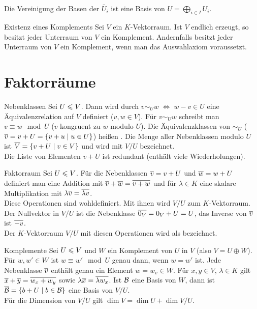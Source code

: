 \begin{Kor}
    Die Vereinigung der Basen der $\widetilde{U_i}$ ist eine Basis
    von $U = \bigoplus_{i \in I} U_i$.
\end{Kor}

\begin{Satz}{Existenz eines Komplements}
    Sei $V$ ein $K$-Vektorraum.
    Ist $V$ endlich erzeugt, so besitzt jeder Unterraum von $V$ ein Komplement.
    Andernfalls besitzt jeder Unterraum von $V$ ein Komplement, wenn man
    das Auswahlaxiom voraussetzt.
\end{Satz}

\section{%
    Faktorräume%
}

\begin{Def}{Nebenklassen}
    Sei $U \leqslant V$.
    Dann wird durch $v \sim_U w \;\Leftrightarrow\; w - v \in U$ eine
    Äquivalenzrelation auf $V$ definiert ($v, w \in V$).
    Für $v \sim_U w$ schreibt man $v \equiv w \mod U$
    ($v$ kongruent zu $w$ modulo $U$).
    Die Äquivalenzklassen von $\sim_U$
    ($\overline{v} = v + U = \{v + u \;|\; u \in U\}$) heißen
    .
    Die Menge aller Nebenklassen modulo $U$ ist
    $\overline{V} = \{v + U \;|\; v \in V\}$ und wird mit $V/U$ bezeichnet. \\
    Die Liste von Elementen $v + U$ ist redundant (enthält viele
    Wiederholungen).
\end{Def}

\begin{Def}{Faktorraum}
    Sei $U \leqslant V$.
    Für die Nebenklassen $\overline{v} = v + U$ und $\overline{w} = w + U$
    definiert man eine Addition mit
    $\overline{v} + \overline{w} = \overline{v + w}$ und für $\lambda \in K$
    eine skalare Multiplikation mit
    $\lambda \overline{v} = \overline{\lambda v}$. \\
    Diese Operationen sind wohldefiniert.
    Mit ihnen wird $V/U$ zum $K$-Vektorraum. \\
    Der Nullvektor in $V/U$ ist die Nebenklasse
    $\overline{0_V} = 0_V + U = U$, das Inverse von $\overline{v}$ ist $\overline{-v}$. \\
    Der $K$-Vektorraum $V/U$ mit diesen Operationen wird als
     bezeichnet.
\end{Def}

\begin{Satz}{Komplemente}
    Sei $U \leqslant V$ und $W$ ein Komplement von $U$ in $V$ (also
    $V = U \oplus W$). \\
    Für $w, w' \in W$ ist $w \equiv w' \mod U$ genau dann, wenn $w = w'$ ist.
    Jede Nebenklasse $\overline{v}$ enthält genau ein Element $w = w_v \in W$.
    Für $x, y \in V$, $\lambda \in K$ gilt
    $\overline{x} + \overline{y} = \overline{w_x + w_y}$ sowie
    $\lambda \overline{x} = \overline{\lambda w_x}$.
    Ist $\mathcal{B}$ eine Basis von $W$, dann ist
    $\overline{\mathcal{B}} = \{b + U \;|\; b \in \mathcal{B}\}$ eine Basis
    von $V/U$. \\
    Für die Dimension von $V/U$ gilt
    $\dim V = \dim U + \dim V/U$.
\end{Satz}

